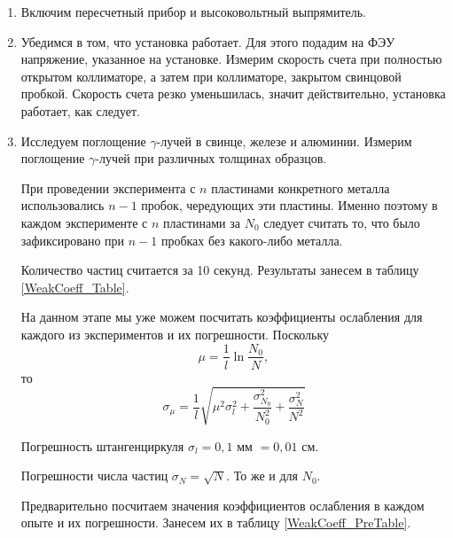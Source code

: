 	\begin{enumerate}
		\item Включим пересчетный прибор и высоковольтный выпрямитель.
		
		\item Убедимся в том, что установка работает. Для этого подадим на ФЭУ напряжение, указанное на установке. Измерим скорость счета при полностью открытом коллиматоре, а затем при коллиматоре, закрытом свинцовой пробкой. Скорость счета резко уменьшилась, значит действительно, установка работает, как следует.
		
		\item Исследуем поглощение $\gamma$-лучей в свинце, железе и алюминии. Измерим поглощение $\gamma$-лучей при различных толщинах образцов.
		
		При проведении эксперимента с $n$ пластинами конкретного металла использовались $n-1$ пробок, чередующих эти пластины. Именно поэтому в каждом эксперименте с $n$ пластинами за $N_0$ следует считать то, что было зафиксировано при $n-1$ пробках без какого-либо металла. 
		
		Количество частиц считается за 10 секунд. Результаты занесем в таблицу \ref{WeakCoeff_Table}.
		
		На данном этапе мы уже можем посчитать коэффициенты ослабления для каждого из экспериментов и их погрешности.
		Поскольку
		\begin{equation*}
			\mu = \frac{1}{l}\ln \frac{N_0}{N},
		\end{equation*}
		\noindent то
		\begin{equation*}
			\sigma_\mu = \frac{1}{l}\sqrt{\mu^2 \sigma_l^2 + \frac{\sigma_{N_0}^2}{N_0^2} + \frac{\sigma_N^2}{N^2}}
		\end{equation*}
	
		Погрешность штангенциркуля $\sigma_l = 0,1$ мм $= 0,01$ см.
		
		Погрешности числа частиц $\sigma_N = \sqrt{N}$. То же и для $N_0$.
		
		Предварительно посчитаем значения коэффициентов ослабления в каждом опыте и их погрешности. Занесем их в таблицу \ref{WeakCoeff_PreTable}.
		


\end{enumerate}
